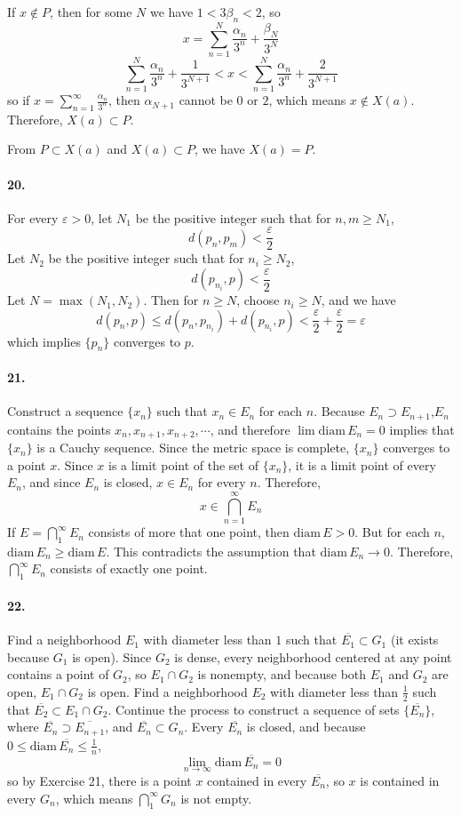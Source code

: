 \documentclass[a4paper]{article}
\begin{document}
If $x\not\in P$, then for some $N$ we have $1<3\beta_n<2$, so
\[
x=\sum_{n=1}^N\frac{\alpha_n}{3^n}+\frac{\beta_N}{3^N}
\]
\[
\sum_{n=1}^N\frac{\alpha_n}{3^n}+\frac{1}{3^{N+1}}<x<\sum_{n=1}^N\frac{\alpha_n}{3^n}+\frac{2}{3^{N+1}}
\]
so if $x=\sum_{n=1}^\infty\frac{\alpha_n}{3^n}$, then $\alpha_{N+1}$ cannot be $0$ or $2$, which means $x\not\in X(a)$. Therefore, $X(a)\subset P$.
\medskip

From $P\subset X(a)$ and $X(a)\subset P$, we have $X(a)=P$.

\paragraph{20.}
For every $\varepsilon>0$, let $N_1$ be the positive integer such that for $n,m\geq N_1$,
\[
d(p_n,p_m)<\frac{\varepsilon}{2}
\]
Let $N_2$ be the positive integer such that for $n_i\geq N_2$,
\[
d(p_{n_i},p)<\frac{\varepsilon}{2}
\]
Let $N=\max(N_1,N_2)$. Then for $n\geq N$, choose $n_i\geq N$, and we have
\[
d(p_n,p)\leq d(p_n,p_{n_i})+d(p_{n_i},p)<\frac{\varepsilon}{2}+\frac{\varepsilon}{2}=\varepsilon
\]
which implies $\{p_n\}$ converges to $p$.

\paragraph{21.}
Construct a sequence $\{x_n\}$ such that $x_n\in E_n$ for each $n$. Because $E_n\supset E_{n+1}$,\;\;$E_n$ contains the points $x_n,x_{n+1},x_{n+2},\cdots$, and therefore $\lim\mathrm{diam}\,E_n=0$ implies that $\{x_n\}$ is a Cauchy sequence. Since the metric space is complete, $\{x_n\}$ converges to a point $x$. Since $x$ is a limit point of the set of $\{x_n\}$, it is a limit point of every $E_n$, and since $E_n$ is closed, $x\in E_n$ for every $n$. Therefore,
\[
x\in\bigcap_{n=1}^\infty E_n
\]
If $E=\bigcap_1^\infty E_n$ consists of more that one point, then $\mathrm{diam}\,E>0$. But for each $n$,\; $\mathrm{diam}\,E_n\geq\mathrm{diam}\,E$. This contradicts the assumption that $\mathrm{diam}\,E_n\to0$. Therefore, $\bigcap_1^\infty E_n$ consists of exactly one point.

\paragraph{22.}
Find a neighborhood $E_1$ with diameter less than $1$ such that $\overline{E_1}\subset G_1$ (it exists because $G_1$ is open). Since $G_2$ is dense, every neighborhood centered at any point contains a point of $G_2$, so $E_1\cap G_2$ is nonempty, and because both $E_1$ and $G_2$ are open, $E_1\cap G_2$ is open. Find a neighborhood $E_2$ with diameter less than $\frac{1}{2}$ such that $\overline{E_2}\subset E_1\cap G_2$. Continue the process to construct a sequence of sets $\{\overline{E_n}\}$, where $\overline{E_n}\supset\overline{E_{n+1}}$, and $\overline{E_n}\subset G_n$. Every $\overline{E_n}$ is closed, and because $0\leq\mathrm{diam}\,\overline{E_n}\leq\frac{1}{n}$,
\[
\lim_{n\to\infty}\mathrm{diam}\,\overline{E_n}=0
\]
so by Exercise 21, there is a point $x$ contained in every $\overline{E_n}$, so $x$ is contained in every $G_n$, which means $\bigcap_1^\infty G_n$ is not empty.
\end{document}
